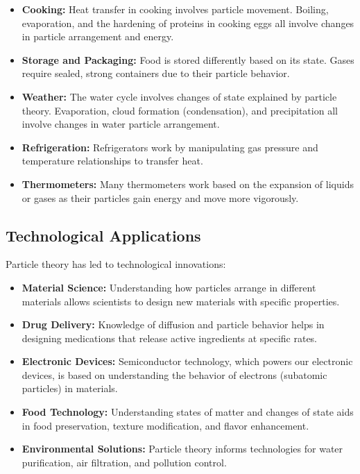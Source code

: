 \documentclass[justified,notoc]{tufte-book}
\begin{document}
\begin{itemize}
    \item \textbf{Cooking:} Heat transfer in cooking involves particle movement. Boiling, evaporation, and the hardening of proteins in cooking eggs all involve changes in particle arrangement and energy.
    
    \item \textbf{Storage and Packaging:} Food is stored differently based on its state. Gases require sealed, strong containers due to their particle behavior.
    
    \item \textbf{Weather:} The water cycle involves changes of state explained by particle theory. Evaporation, cloud formation (condensation), and precipitation all involve changes in water particle arrangement.
    
    \item \textbf{Refrigeration:} Refrigerators work by manipulating gas pressure and temperature relationships to transfer heat.
    
    \item \textbf{Thermometers:} Many thermometers work based on the expansion of liquids or gases as their particles gain energy and move more vigorously.
\end{itemize}

\subsection{Technological Applications}

Particle theory has led to technological innovations:

\begin{itemize}
    \item \textbf{Material Science:} Understanding how particles arrange in different materials allows scientists to design new materials with specific properties.
    
    \item \textbf{Drug Delivery:} Knowledge of diffusion and particle behavior helps in designing medications that release active ingredients at specific rates.
    
    \item \textbf{Electronic Devices:} Semiconductor technology, which powers our electronic devices, is based on understanding the behavior of electrons (subatomic particles) in materials.
    
    \item \textbf{Food Technology:} Understanding states of matter and changes of state aids in food preservation, texture modification, and flavor enhancement.
    
    \item \textbf{Environmental Solutions:} Particle theory informs technologies for water purification, air filtration, and pollution control.
\end{itemize}
\end{document}
